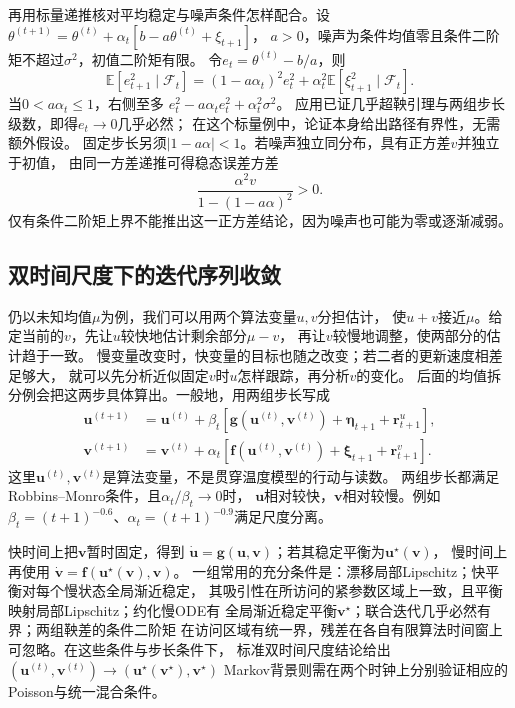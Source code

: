 再用标量递推核对平均稳定与噪声条件怎样配合。设
$\theta^{(t+1)}=\theta^{(t)}+\alpha_t[b-a\theta^{(t)}+\xi_{t+1}]$，
$a>0$，噪声为条件均值零且条件二阶矩不超过$\sigma^2$，初值二阶矩有限。
令$e_t=\theta^{(t)}-b/a$，则
\[
  \mathbb E[e_{t+1}^2\mid\mathcal F_t]
  =(1-a\alpha_t)^2e_t^2+
       \alpha_t^2\mathbb E[\xi_{t+1}^2\mid\mathcal F_t].
\]
当$0<a\alpha_t\leq1$，右侧至多
$e_t^2-a\alpha_te_t^2+\alpha_t^2\sigma^2$。
应用已证几乎超鞅引理与两组步长级数，即得$e_t\to0$几乎必然；
在这个标量例中，论证本身给出路径有界性，无需额外假设。
固定步长另须$|1-a\alpha|<1$。若噪声独立同分布，具有正方差$v$并独立于初值，
由同一方差递推可得稳态误差方差
\[
 \frac{\alpha^2v}{1-(1-a\alpha)^2}>0.
\]
仅有条件二阶矩上界不能推出这一正方差结论，因为噪声也可能为零或逐渐减弱。

\subsection{双时间尺度下的迭代序列收敛}
\label{sec:action-state-two-timescale}

仍以未知均值$\mu$为例，我们可以用两个算法变量$u,v$分担估计，
使$u+v$接近$\mu$。给定当前的$v$，先让$u$较快地估计剩余部分$\mu-v$，
再让$v$较慢地调整，使两部分的估计趋于一致。
慢变量改变时，快变量的目标也随之改变；若二者的更新速度相差足够大，
就可以先分析近似固定$v$时$u$怎样跟踪，再分析$v$的变化。
后面的均值拆分例会把这两步具体算出。一般地，用两组步长写成
\begin{align*}
  \bm u^{(t+1)}
    &=\bm u^{(t)}+\beta_t[
        \bm g(\bm u^{(t)},\bm v^{(t)})+\bm\eta_{t+1}+\bm r^u_{t+1}],\\
  \bm v^{(t+1)}
    &=\bm v^{(t)}+\alpha_t[
        \bm f(\bm u^{(t)},\bm v^{(t)})+\bm\xi_{t+1}+\bm r^v_{t+1}].
\end{align*}
这里$\bm u^{(t)},\bm v^{(t)}$是算法变量，不是贯穿温度模型的行动与读数。
两组步长都满足Robbins--Monro条件，且$\alpha_t/\beta_t\to0$时，
$\bm u$相对较快，$\bm v$相对较慢。例如
$\beta_t=(t+1)^{-0.6}$、$\alpha_t=(t+1)^{-0.9}$满足尺度分离。

快时间上把$\bm v$暂时固定，得到
$\dot{\bm u}=\bm g(\bm u,\bm v)$；若其稳定平衡为$\bm u^\star(\bm v)$，
慢时间上再使用
$\dot{\bm v}=\bm f(\bm u^\star(\bm v),\bm v)$。
一组常用的充分条件是：漂移局部Lipschitz；快平衡对每个慢状态全局渐近稳定，
其吸引性在所访问的紧参数区域上一致，且平衡映射局部Lipschitz；约化慢ODE有
全局渐近稳定平衡$\bm v^\star$；联合迭代几乎必然有界；两组鞅差的条件二阶矩
在访问区域有统一界，残差在各自有限算法时间窗上可忽略。在这些条件与步长条件下，
标准双时间尺度结论给出
$(\bm u^{(t)},\bm v^{(t)})\to
(\bm u^\star(\bm v^\star),\bm v^\star)$
Markov背景则需在两个时钟上分别验证相应的Poisson与统一混合条件。

